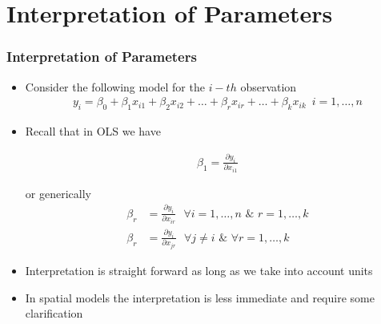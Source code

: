 \documentclass[
  shownotes,
  xcolor={svgnames},
  hyperref={colorlinks,citecolor=DarkBlue,linkcolor=DarkRed,urlcolor=DarkBlue}
  , aspectratio=169]{beamer}
\begin{document}
\section{Interpretation of Parameters}
\begin{frame}
\frametitle{Interpretation of Parameters}
\begin{itemize}
  \item Consider the following model for the $i-th$ observation
\begin{align}
y_i = \beta_0 +\beta_1 x_{i1}+\beta_2 x_{i2}+\dots+\beta_r x_{ir}+\dots+\beta_k x_{ik} \,\,\, i=1,\dots,n \nonumber
\end{align}

  \item Recall that in OLS we have


\begin{align}
\beta_1=\frac{\partial y_i}{\partial x_{i1}} \nonumber
\end{align}

or generically
\begin{align}
\beta_r&=\frac{\partial y_i}{\partial x_{ir}}  \,\,\,\,  \forall i=1,\dots,n\,\,\&\,\, r=1,\dots,k \nonumber \\
\beta_r&=\frac{\partial y_i}{\partial x_{jr}} \,\,\,\,  \forall j\neq i\,\,\&\,\, \forall r=1,\dots,k \nonumber
\end{align}

\item Interpretation is straight forward as long as we take into account units
\medskip
\item In spatial models the interpretation is less immediate and require some clarification
\end{itemize}

\end{frame}
\end{document}
